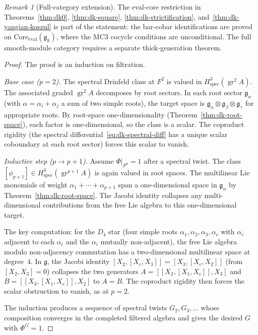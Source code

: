 \documentclass[11pt,reqno]{amsart}
\theoremstyle{definition}
\theoremstyle{remark}
\newtheorem{remark}[theorem]{Remark}
\DeclareMathOperator{\gr}{gr}
\newcommand{\fg}{\mathfrak{g}}
\numberwithin{equation}{section}
\begin{document}
\begin{remark}[Full-category extension]
\label{rem:dk-eval-core-full-category}
The eval-core restriction in
Theorems~\ref{thm:dk0}, \ref{thm:dk-square},
\ref{thm:dk-strictification}, and~\ref{thm:dk-yangian-koszul}
is part of the statement: the bar-cobar identifications are proved on
${\mathrm{Core}}_{\mathrm{eval}}(\widehat{\mathfrak{g}}_k)$,
where the MC3 cocycle conditions are unconditional.
The full smooth-module category requires a separate thick-generation
theorem.
\end{remark}

\begin{proof}
The proof is an induction on filtration.

\emph{Base case ($p = 2$).}
The spectral Drinfeld class at $F^2$ is valued in
$H^3_{\mathrm{spec}}(\gr^2 A)$.  The associated graded
$\gr^2 A$ decomposes by root sectors.  In each root sector
$\fg_\alpha$ (with $\alpha = \alpha_i + \alpha_j$ a sum of
two simple roots), the target space is
$\fg_\alpha \otimes \fg_\beta \otimes \fg_\gamma$ for
appropriate roots.  By root-space one-dimensionality
(Theorem~\ref{thm:dk-root-space}), each factor is
one-dimensional, so the class is a scalar.  The coproduct
rigidity (the spectral
differential~\eqref{eq:dk-spectral-diff} has a unique
scalar coboundary at each root sector) forces this scalar
to vanish.

\emph{Inductive step ($p \to p+1$).}
Assume $\Phi|_{F^p} = 1$ after a spectral twist.
The class $[\phi_{p+1}] \in H^3_{\mathrm{spec}}(\gr^{p+1} A)$
is again valued in root spaces.  The multilinear Lie
monomials of weight $\alpha_1 + \cdots + \alpha_{p+1}$
span a one-dimensional space in $\fg_\alpha$ by
Theorem~\ref{thm:dk-root-space}.  The Jacobi identity
collapses any multi-dimensional contributions from the free
Lie algebra to this one-dimensional target.

The key computation: for the $D_4$ star (four simple roots
$\alpha_1, \alpha_2, \alpha_3, \alpha_c$ with $\alpha_c$
adjacent to each $\alpha_i$ and the $\alpha_i$ mutually
non-adjacent), the free Lie algebra modulo non-adjacency
commutation has a two-dimensional multilinear space at
degree~$4$.  In $\fg$, the Jacobi identity
$[X_2, [X_c, X_3]] = [X_3, [X_c, X_2]]$
(from $[X_2, X_3] = 0$) collapses the two generators
$A = [[X_2, [X_1, X_c]], X_3]$ and
$B = [[X_3, [X_1, X_c]], X_2]$ to $A = B$.
The coproduct rigidity then forces the scalar obstruction
to vanish, as at $p = 2$.

The induction produces a sequence of spectral twists
$G_2, G_3, \ldots$ whose composition converges in the
completed filtered algebra and gives the desired $G$ with
$\Phi^G = 1$.
\end{proof}
\end{document}
